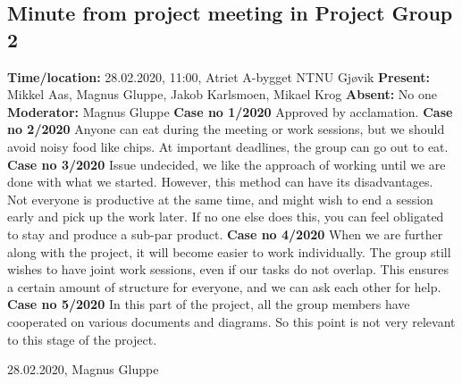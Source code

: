 \documentclass{article}
\begin{document}
\subsection{Minute from project meeting in Project Group 2}
\newline
\textbf{Time/location:} 28.02.2020, 11:00, Atriet A-bygget NTNU Gjøvik
\newline
\textbf{Present: }Mikkel Aas, Magnus Gluppe, Jakob Karlsmoen, Mikael Krog
\newline
\textbf{Absent:} No one
\newline
\textbf{Moderator:} Magnus Gluppe
 \newline \newline
\textbf{Case no 1/2020} \newline
Approved by acclamation.  \newline  \newline
\textbf{Case no 2/2020}  \newline
Anyone can eat during the meeting or work sessions, but we should avoid noisy food like chips. At important deadlines, the group can go out to eat. \newline  \newline
\textbf{Case no 3/2020}  \newline
Issue undecided, we like the approach of working until we are done with what we started. However, this method can have its disadvantages. Not everyone is productive at the same time, and might wish to end a session early and pick up the work later. If no one else does this, you can feel obligated to stay and produce a sub-par product.  \newline  \newline
\textbf{Case no 4/2020}  \newline
When we are further along with the project, it will become easier to work individually. The group still wishes to have joint work sessions, even if our tasks do not overlap. This ensures a certain amount of structure for everyone, and we can ask each other for help.  \newline  \newline
\textbf{Case no 5/2020}  \newline
In this part of the project, all the group members have cooperated on various documents and diagrams. So this point is not very relevant to this stage of the project. 


\begin{flushright}28.02.2020, Magnus Gluppe\end{flushright}
\end{document}
